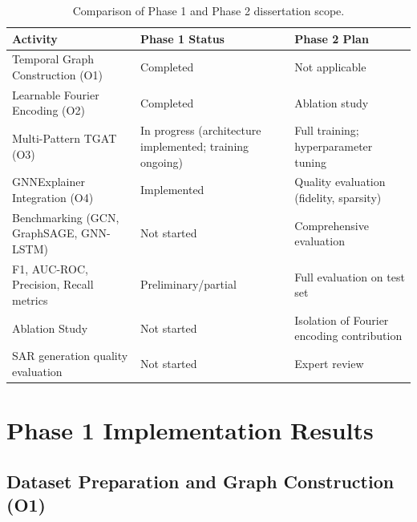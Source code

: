 \begin{table}[!htbp]
\centering
\caption[Phase 1 vs Phase 2 Scope]{Comparison of Phase 1 and Phase 2 dissertation scope.}
\label{tab:phase_scope}
\begin{tabularx}{\textwidth}{>{\hsize}L >{\hsize}L >{\hsize}L}
\toprule
\textbf{Activity} & \textbf{Phase 1 Status} & \textbf{Phase 2 Plan} \\
\midrule
Temporal Graph Construction (O1) & Completed & Not applicable \\
Learnable Fourier Encoding (O2) & Completed & Ablation study \\
Multi-Pattern TGAT (O3) & In progress (architecture implemented; training ongoing) & Full training; hyperparameter tuning \\
GNNExplainer Integration (O4) & Implemented & Quality evaluation (fidelity, sparsity) \\
Benchmarking (GCN, GraphSAGE, GNN-LSTM) & Not started & Comprehensive evaluation \\
F1, AUC-ROC, Precision, Recall metrics & Preliminary/partial & Full evaluation on test set \\
Ablation Study & Not started & Isolation of Fourier encoding contribution \\
SAR generation quality evaluation & Not started & Expert review \\
\bottomrule
\end{tabularx}
\end{table}


\section{Phase 1 Implementation Results}
\label{sec:phase1_results}

\subsection{Dataset Preparation and Graph Construction (O1)}

